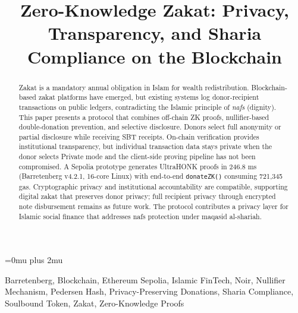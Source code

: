 \documentclass[conference]{IEEEtran}
\begin{document}
\Urlmuskip=0mu plus 2mu

\title{Zero-Knowledge Zakat: Privacy, Transparency, and Sharia Compliance on the Blockchain}

\author{
\and
{}
}

\maketitle

\begin{abstract}
Zakat is a mandatory annual obligation in Islam for wealth redistribution. Blockchain-based zakat platforms have emerged, but existing systems log donor-recipient transactions on public ledgers, contradicting the Islamic principle of \textit{nafs} (dignity). This paper presents a protocol that combines off-chain ZK proofs, nullifier-based double-donation prevention, and selective disclosure. Donors select full anonymity or partial disclosure while receiving SBT receipts. On-chain verification provides institutional transparency, but individual transaction data stays private when the donor selects Private mode and the client-side proving pipeline has not been compromised. A Sepolia prototype generates UltraHONK proofs in 246.8 ms (Barretenberg v4.2.1, 16-core Linux) with end-to-end \texttt{donateZK()} consuming 721,345 gas. Cryptographic privacy and institutional accountability are compatible, supporting digital zakat that preserves donor privacy; full recipient privacy through encrypted note disbursement remains as future work. The protocol contributes a privacy layer for Islamic social finance that addresses nafs protection under maqasid al-shariah.
\end{abstract}

\begin{IEEEkeywords}
Barretenberg, Blockchain, Ethereum Sepolia, Islamic FinTech, Noir, Nullifier Mechanism, Pedersen Hash, Privacy-Preserving Donations, Sharia Compliance, Soulbound Token, Zakat, Zero-Knowledge Proofs
\end{IEEEkeywords}
\end{document}
